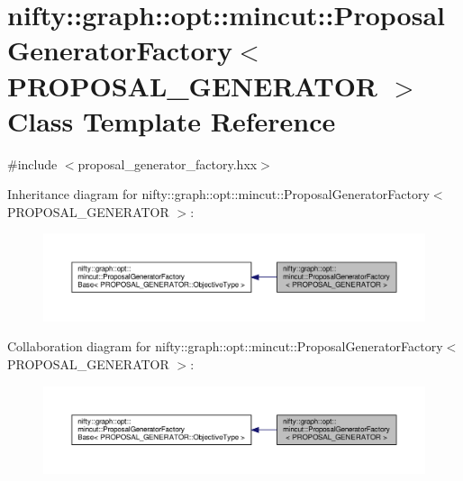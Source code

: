 \hypertarget{classnifty_1_1graph_1_1opt_1_1mincut_1_1ProposalGeneratorFactory}{}\section{nifty\+:\+:graph\+:\+:opt\+:\+:mincut\+:\+:Proposal\+Generator\+Factory$<$ P\+R\+O\+P\+O\+S\+A\+L\+\_\+\+G\+E\+N\+E\+R\+A\+T\+OR $>$ Class Template Reference}
\label{classnifty_1_1graph_1_1opt_1_1mincut_1_1ProposalGeneratorFactory}


{\ttfamily \#include $<$proposal\+\_\+generator\+\_\+factory.\+hxx$>$}



Inheritance diagram for nifty\+:\+:graph\+:\+:opt\+:\+:mincut\+:\+:Proposal\+Generator\+Factory$<$ P\+R\+O\+P\+O\+S\+A\+L\+\_\+\+G\+E\+N\+E\+R\+A\+T\+OR $>$\+:
\nopagebreak
\begin{figure}[H]
\begin{center}
\leavevmode
\includegraphics[width=350pt]{classnifty_1_1graph_1_1opt_1_1mincut_1_1ProposalGeneratorFactory__inherit__graph}
\end{center}
\end{figure}


Collaboration diagram for nifty\+:\+:graph\+:\+:opt\+:\+:mincut\+:\+:Proposal\+Generator\+Factory$<$ P\+R\+O\+P\+O\+S\+A\+L\+\_\+\+G\+E\+N\+E\+R\+A\+T\+OR $>$\+:
\nopagebreak
\begin{figure}[H]
\begin{center}
\leavevmode
\includegraphics[width=350pt]{classnifty_1_1graph_1_1opt_1_1mincut_1_1ProposalGeneratorFactory__coll__graph}
\end{center}
\end{figure}
